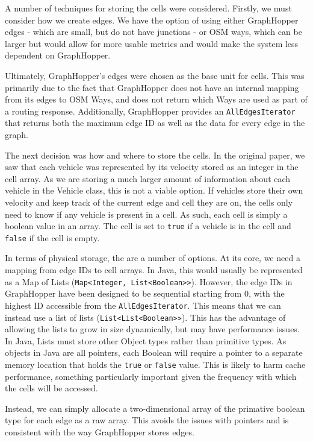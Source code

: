 \documentclass[ %
                    author={Alexander Hill},
                supervisor={Dr. Benjamin Sach},
                    degree={MEng},
                     title={MARMOSET},
                  subtitle={Multi-Agent Route Management using Online Simulation for Efficient Transportation},
                      type={research},
                      year={2016} ]{dissertation}
\begin{document}
A number of techniques for storing the cells were considered. Firstly, we must
consider how we create edges. We have the option of using either GraphHopper
edges - which are small, but do not have junctions - or OSM ways, which can be
larger but would allow for more usable metrics and would make the system less
dependent on GraphHopper.

Ultimately, GraphHopper's edges were chosen as the base unit for cells. This was
primarily due to the fact that GraphHopper does not have an internal mapping
from its edges to OSM Ways, and does not return which Ways are used as part of a
routing response. Additionally, GraphHopper provides an
\texttt{AllEdgesIterator} that returns both the maximum edge ID as well as the
data for every edge in the graph.

The next decision was how and where to store the cells. In the original paper, we
saw that each vehicle was represented by its velocity stored as an integer in
the cell array. As we are storing a much larger amount of information about each
vehicle in the Vehicle class, this is not a viable option. If vehicles store
their own velocity and keep track of the current edge and cell they are on, the
cells only need to know if any vehicle is present in a cell. As such, each cell
is simply a boolean value in an array. The cell is set to \texttt{true} if a
vehicle is in the cell and \texttt{false} if the cell is empty.

In terms of physical storage, the are a number of options. At its core, we need
a mapping from edge IDs to cell arrays. In Java, this would usually be
represented as a Map of Lists (\texttt{Map<Integer, List<Boolean>>}). However,
the edge IDs in GraphHopper have been designed to be sequential starting from 0,
with the highest ID accessible from the \texttt{AllEdgesIterator}. This means
that we can instead use a list of lists (\texttt{List<List<Boolean>>}). This has
the advantage of allowing the lists to grow in size dynamically, but may have
performance issues. In Java, Lists must store other Object types rather than
primitive types. As objects in Java are all pointers, each Boolean will require
a pointer to a separate memory location that holds the \texttt{true} or
\texttt{false} value.  This is likely to harm cache performance, something
particularly important given the frequency with which the cells will be
accessed.

Instead, we can simply allocate a two-dimensional array of the primative boolean
type for each edge as a raw array. This avoids the issues with pointers and is
consistent with the way GraphHopper stores edges.
\end{document}
